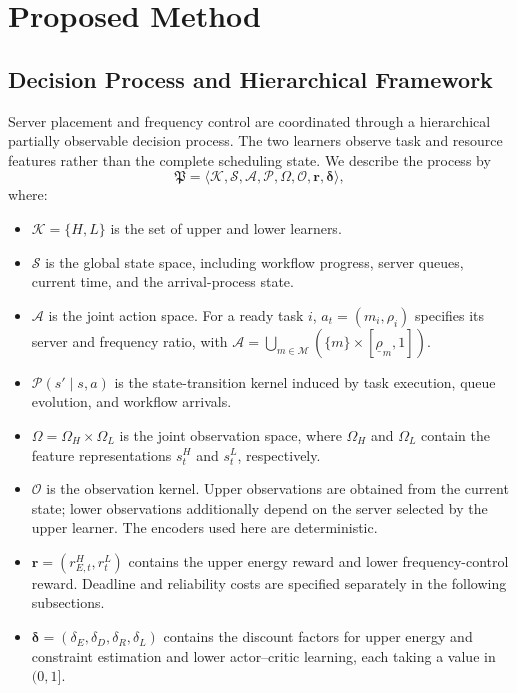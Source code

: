 \documentclass[10pt,twocolumn]{article}
\begin{document}
\setcounter{section}{3}

\section{Proposed Method}
\label{sec:method}

\subsection{Decision Process and Hierarchical Framework}
\label{subsec:framework}

Server placement and frequency control are coordinated through a
hierarchical partially observable decision process. The two learners
observe task and resource features rather than the complete scheduling
state. We describe the process by
\begin{equation}
 \mathfrak P=\langle\mathcal K,\mathcal S,\mathcal A,\mathcal P,
 \Omega,\mathcal O,\mathbf r,\boldsymbol\delta\rangle,
 \label{eq:method_pomdp}
\end{equation}
where:
\begin{itemize}
 \item $\mathcal K=\{H,L\}$ is the set of upper and lower learners.
 \item $\mathcal S$ is the global state space, including workflow progress,
 server queues, current time, and the arrival-process state.
 \item $\mathcal A$ is the joint action space. For a ready task $i$,
 $a_t=(m_i,\rho_i)$ specifies its server and frequency ratio, with
 $\mathcal A=\bigcup_{m\in\mathcal M}
 (\{m\}\times[\underline\rho_m,1])$.
 \item $\mathcal P(s'\mid s,a)$ is the state-transition kernel induced by
 task execution, queue evolution, and workflow arrivals.
 \item $\Omega=\Omega_H\times\Omega_L$ is the joint observation space,
 where $\Omega_H$ and $\Omega_L$ contain the feature representations
 $s_t^H$ and $s_t^L$, respectively.
 \item $\mathcal O$ is the observation kernel. Upper observations are
 obtained from the current state; lower observations additionally depend
 on the server selected by the upper learner. The encoders used here
 are deterministic.
 \item $\mathbf r=(r_{E,t}^H,r_t^L)$ contains the upper energy reward and
 lower frequency-control reward. Deadline and reliability costs are
 specified separately in the following subsections.
 \item $\boldsymbol\delta=(\delta_E,\delta_D,\delta_R,\delta_L)$ contains
 the discount factors for upper energy and constraint estimation and
 lower actor--critic learning, each taking a value in $(0,1]$.
\end{itemize}
\end{document}
